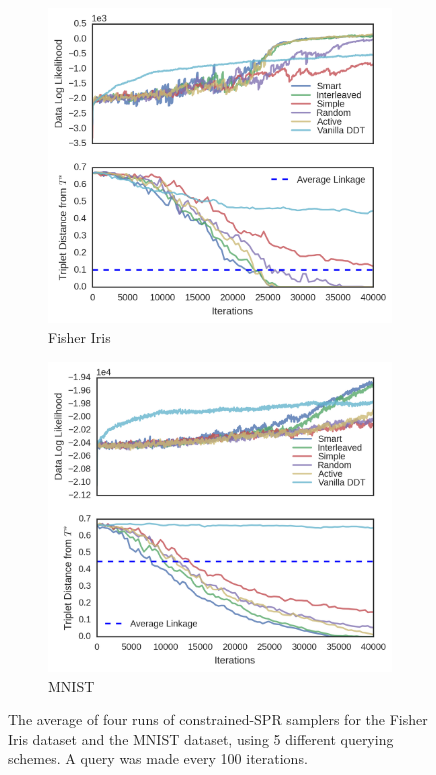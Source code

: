 \begin{figure}
    \begin{subfigure}[]{0.5\textwidth}
        \centering
        \includegraphics[width=\textwidth]{img/Fisher Iris-result.png}
        \caption{Fisher Iris}
        \label{fig:iris-result}
    \end{subfigure}
    \begin{subfigure}[]{0.5\textwidth}
        \centering
        \includegraphics[width=\textwidth]{img/MNIST-result.png}
        \caption{MNIST}
        \label{fig:mnist-result}
    \end{subfigure}
    \caption{The average of four runs of constrained-SPR samplers
    for the Fisher Iris dataset and the MNIST dataset, using 5 different querying schemes. A query was made every 100 iterations.}
    \label{fig:main-results}
\end{figure}


